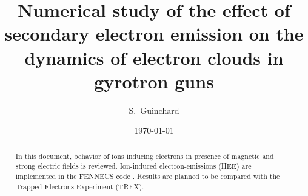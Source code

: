 \documentclass[aps,prc,floatfix,showkeys,nofootinbib]{revtex4-1}
\begin{document}
\title{Numerical study of the effect of secondary electron emission on the dynamics of electron clouds in gyrotron guns }

\author{S.~Guinchard} 


\date{\today}

\begin{abstract}
In this document, behavior of ions inducing electrons in presence of magnetic and strong electric fields is reviewed. Ion-induced electron-emissions (IIEE) are implemented in the FENNECS code \cite{fennecs}. Results are planned to be compared with the Trapped Electrons Experiment (TREX).
\end{abstract}

{
\let\clearpage\relax
\maketitle
\sloppy
}















\newpage


\end{document}
